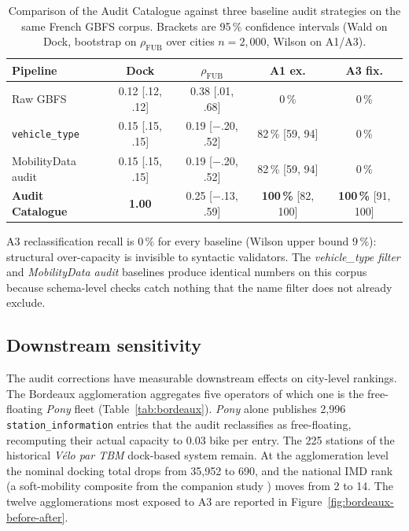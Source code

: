 \documentclass[11pt,a4paper]{article}
\begin{document}
\begin{table}[ht]
\centering
\caption{Comparison of the Audit Catalogue against three baseline audit
strategies on the same French GBFS corpus. Brackets are 95\,\%
confidence intervals (Wald on Dock, bootstrap on
$\rho_{\text{FUB}}$ over cities $n=2{,}000$, Wilson on A1/A3).}
\label{tab:baselines}
\small
\begin{tabular}{@{}lcccc@{}}
\toprule
\textbf{Pipeline} & \textbf{Dock} & \textbf{$\rho_{\text{FUB}}$} &
\textbf{A1 ex.} & \textbf{A3 fix.}\\
\midrule
Raw GBFS                 & 0.12 \footnotesize[.12, .12] & 0.38 \footnotesize[.01, .68] & 0\,\% & 0\,\%\\
\texttt{vehicle\_type}    & 0.15 \footnotesize[.15, .15] & 0.19 \footnotesize[$-$.20, .52] & 82\,\% \footnotesize[59, 94] & 0\,\%\\
MobilityData audit       & 0.15 \footnotesize[.15, .15] & 0.19 \footnotesize[$-$.20, .52] & 82\,\% \footnotesize[59, 94] & 0\,\%\\
\textbf{Audit Catalogue}   & \textbf{1.00} & 0.25 \footnotesize[$-$.13, .59] & \textbf{100\,\%} \footnotesize[82, 100] & \textbf{100\,\%} \footnotesize[91, 100]\\
\bottomrule
\end{tabular}
\end{table}

A3 reclassification recall is $0\,\%$ for every baseline (Wilson
upper bound $9\,\%$): structural over-capacity is invisible to
syntactic validators. The \emph{vehicle\_type filter} and
\emph{MobilityData audit} baselines produce identical numbers on
this corpus because schema-level checks catch nothing that the name
filter does not already exclude.

\subsection{Downstream sensitivity}
The audit corrections have measurable downstream effects on city-level
rankings. The Bordeaux agglomeration aggregates five operators of
which one is the free-floating \emph{Pony} fleet
(Table~\ref{tab:bordeaux}). \emph{Pony} alone publishes 2{,}996
\texttt{station\_information} entries that the audit reclassifies as
free-floating, recomputing their actual capacity to 0.03 bike per
entry. The 225 stations of the historical \emph{V\'elo par TBM}
dock-based system remain. At the agglomeration level the nominal
docking total drops from 35{,}952 to 690, and the national IMD rank
(a soft-mobility composite from the companion study
\cite{Fosse2026imd}) moves from 2 to 14. The twelve agglomerations
most exposed to A3 are reported in Figure~\ref{fig:bordeaux-before-after}.
\end{document}
